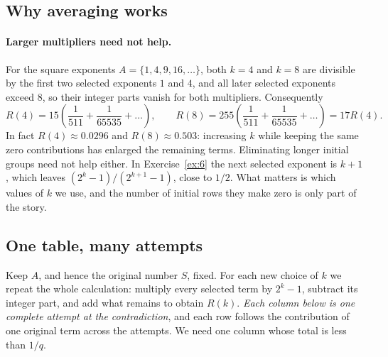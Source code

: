 \documentclass[10pt]{article}
\theoremstyle{plain}
\theoremstyle{definition}
\theoremstyle{remark}
\begin{document}
\begin{samepage}
\section{Why averaging works}\label{sec:general}

\paragraph{Larger multipliers need not help.}
For the square exponents $A=\{1,4,9,16,\dots\}$, both $k=4$ and $k=8$
are divisible by the first two selected exponents $1$ and $4$, and all
later selected exponents exceed $8$, so their integer parts vanish for
both multipliers. Consequently
\[
 R(4)=15\left(\frac1{511}+\frac1{65535}+\dots\right),\qquad
 R(8)=255\left(\frac1{511}+\frac1{65535}+\dots\right)=17R(4).
\]
In fact $R(4)\approx0.0296$ and $R(8)\approx0.503$: increasing $k$
while keeping the same zero contributions has enlarged the remaining
terms. Eliminating longer initial groups need not help either. In
Exercise~\ref{ex:6} the next selected exponent is $k+1$, which leaves
$(2^k-1)/(2^{k+1}-1)$, close to $1/2$. What matters is which values of
$k$ we use, and the number of initial rows they make zero is only part
of the story.\par
\end{samepage}

\subsection{One table, many attempts}

Keep $A$, and hence the original number $S$, fixed. For each new
choice of $k$ we repeat the whole calculation: multiply every selected
term by $2^k-1$, subtract its integer part, and add what remains to
obtain $R(k)$. \emph{Each column below is one complete attempt at the
contradiction}, and each row follows the contribution of one original
term across the attempts. We need one column whose total is less than
$1/q$.
\end{document}
